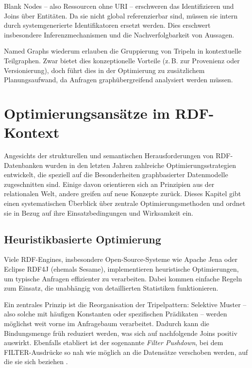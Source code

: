 \documentclass[12pt]{article}
\begin{document}
Blank Nodes – also Ressourcen ohne URI – erschweren das Identifizieren und Joins über Entitäten. Da sie nicht global referenzierbar sind, müssen sie intern durch systemgenerierte Identifikatoren ersetzt werden. Dies erschwert insbesondere Inferenzmechanismen und die Nachverfolgbarkeit von Aussagen.

Named Graphs wiederum erlauben die Gruppierung von Tripeln in kontextuelle Teilgraphen. Zwar bietet dies konzeptionelle Vorteile (z.\,B. zur Provenienz oder Versionierung), doch führt dies in der Optimierung zu zusätzlichem Planungsaufwand, da Anfragen graphübergreifend analysiert werden müssen.

\section{Optimierungsansätze im RDF-Kontext} \label{sec:ansaetze}

Angesichts der strukturellen und semantischen Herausforderungen von RDF-Datenbanken wurden in den letzten Jahren zahlreiche Optimierungsstrategien entwickelt, die speziell auf die Besonderheiten graphbasierter Datenmodelle zugeschnitten sind. Einige davon orientieren sich an Prinzipien aus der relationalen Welt, andere greifen auf neue Konzepte zurück. Dieses Kapitel gibt einen systematischen Überblick über zentrale Optimierungsmethoden und ordnet sie in Bezug auf ihre Einsatzbedingungen und Wirksamkeit ein.

\subsection{Heuristikbasierte Optimierung}

Viele RDF-Engines, insbesondere Open-Source-Systeme wie Apache Jena oder Eclipse RDF4J (ehemals Sesame), implementieren heuristische Optimierungen, um typische Anfragen effizienter zu verarbeiten. Dabei kommen einfache Regeln zum Einsatz, die unabhängig von detaillierten Statistiken funktionieren.

Ein zentrales Prinzip ist die Reorganisation der Tripelpattern: Selektive Muster – also solche mit häufigen Konstanten oder spezifischen Prädikaten – werden möglichst weit vorne im Anfragebaum verarbeitet. Dadurch kann die Bindungsmenge früh reduziert werden, was sich auf nachfolgende Joins positiv auswirkt. Ebenfalls etabliert ist der sogenannte \textit{Filter Pushdown}, bei dem FILTER-Ausdrücke so nah wie möglich an die Datensätze verschoben werden, auf die sie sich beziehen \cite{yuan2015heuristics}.
\end{document}
